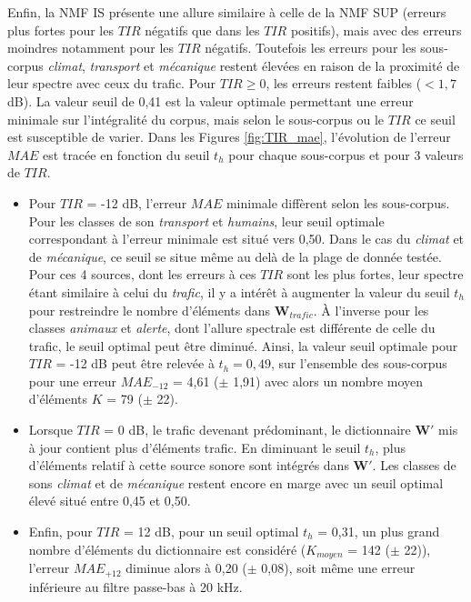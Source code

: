 Enfin, la NMF IS présente une allure similaire à celle de la NMF SUP (erreurs plus fortes pour les $TIR$ négatifs que dans les $TIR$ positifs), mais avec des erreurs moindres notamment pour les $TIR$ négatifs. Toutefois les erreurs pour les sous-corpus \textit{climat}, \textit{transport} et \textit{mécanique} restent élevées en raison de la proximité de leur spectre avec ceux du trafic. Pour $TIR \geq 0$, les erreurs restent faibles ($< 1,7$ dB). La valeur seuil de 0,41 est la valeur optimale permettant une erreur minimale sur l'intégralité du corpus, mais selon le sous-corpus ou le $TIR$ ce seuil est susceptible de varier.
Dans les Figures \ref{fig:TIR_mae}, l'évolution de l'erreur $MAE$ est tracée en fonction du seuil $t_h$ pour chaque sous-corpus et pour 3 valeurs de $TIR$.
\begin{itemize}
\item Pour $TIR$ = -12 dB, l'erreur $MAE$ minimale diffèrent selon les sous-corpus.
Pour les classes de son \textit{transport} et \textit{humains}, leur seuil optimale correspondant à l'erreur minimale est situé vers 0,50. Dans le cas du \textit{climat} et de \textit{mécanique}, ce seuil se situe même au delà de la plage de donnée testée.  Pour ces 4 sources, dont les erreurs à ces $TIR$ sont les plus fortes, leur spectre étant similaire à celui du \textit{trafic}, il y a intérêt à augmenter la valeur du seuil $t_h$ pour restreindre le nombre d'éléments dans $\mathbf{W}_{trafic}$. À l'inverse pour  les classes \textit{animaux} et \textit{alerte}, dont l'allure spectrale est différente de celle du trafic, le seuil optimal peut être diminué.
Ainsi, la valeur seuil optimale pour $TIR$ = -12 dB peut être relevée à $t_h = 0,49$, sur l'ensemble des sous-corpus pour une erreur $MAE_{-12}$ = 4,61 ($\pm$ 1,91) avec alors un nombre moyen d'éléments $K$ = 79 ($\pm$ 22).
\item Lorsque $TIR$ = 0 dB, le trafic devenant prédominant, le dictionnaire $\mathbf{W'}$ mis à jour contient plus d'éléments trafic. En diminuant le seuil $t_h$, plus d'éléments relatif à cette source sonore sont intégrés dans $\mathbf{W'}$.
Les classes de sons \textit{climat} et de \textit{mécanique} restent encore en marge avec un seuil optimal élevé situé entre 0,45 et 0,50.
\item Enfin, pour $TIR$ = 12 dB, pour un seuil optimal $t_h$ = 0,31, un plus grand nombre d'éléments du dictionnaire est considéré ($K_{moyen}$ = 142 ($\pm$ 22)), l'erreur $MAE_{+12}$ diminue alors à 0,20 ($\pm$ 0,08), soit même une erreur inférieure au filtre passe-bas à 20 kHz.\\
\end{itemize}

